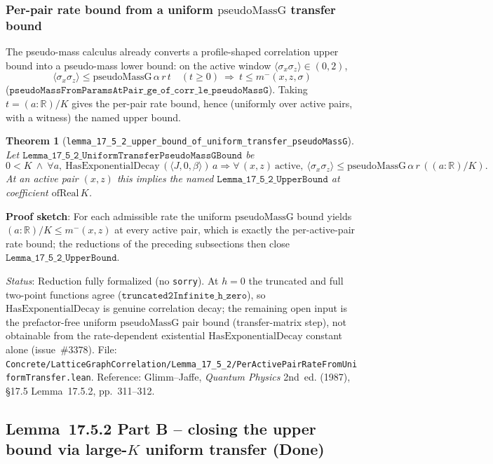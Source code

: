 \documentclass[a4paper,11pt]{article}
\newtheorem{theorem}{Theorem}
\begin{document}
\subsubsection*{Per-pair rate bound from a uniform $\mathrm{pseudoMassG}$ transfer
bound}

The pseudo-mass calculus already converts a profile-shaped correlation upper
bound into a pseudo-mass lower bound: on the active window
$\langle\sigma_x\sigma_z\rangle\in(0,2)$,
\[
  \langle\sigma_x\sigma_z\rangle\le \mathrm{pseudoMassG}\,\alpha\,r\,t
  \quad(t\ge0)
  \ \Longrightarrow\
  t\le m^-(x,z,\sigma)
\]
($\mathtt{pseudoMassFromParamsAtPair\_ge\_of\_corr\_le\_pseudoMassG}$).  Taking
$t=(a:\mathbb{R})/K$ gives the per-pair rate bound, hence (uniformly over active
pairs, with a witness) the named upper bound.

\begin{theorem}[\texttt{lemma\_17\_5\_2\_upper\_bound\_of\_uniform\_transfer\_pseudoMassG}]
Let $\mathtt{Lemma\_17\_5\_2\_UniformTransferPseudoMassGBound}$ be
\[
  0<K\ \wedge\ \forall a,\
  \mathrm{HasExponentialDecay}\,(\langle J,0,\beta\rangle)\,a
  \Rightarrow
  \forall\,(x,z)\ \text{active},\
  \langle\sigma_x\sigma_z\rangle\le\mathrm{pseudoMassG}\,\alpha\,r\,((a:\mathbb{R})/K).
\]
At an active pair $(x,z)$ this implies the named
$\mathtt{Lemma\_17\_5\_2\_UpperBound}$ at coefficient $\mathrm{ofReal}\,K$.
\end{theorem}

\noindent\textbf{Proof sketch}:
For each admissible rate the uniform $\mathrm{pseudoMassG}$ bound yields
$(a:\mathbb{R})/K\le m^-(x,z)$ at every active pair, which is exactly the
per-active-pair rate bound; the reductions of the preceding subsections then
close $\mathtt{Lemma\_17\_5\_2\_UpperBound}$.

\noindent\textit{Status}: Reduction fully formalized (no \texttt{sorry}).  At
$h=0$ the truncated and full two-point functions agree
($\mathtt{truncated2Infinite\_h\_zero}$), so $\mathrm{HasExponentialDecay}$ is
genuine correlation decay; the remaining open input is the prefactor-free uniform
$\mathrm{pseudoMassG}$ pair bound (transfer-matrix step), not obtainable from the
rate-dependent existential $\mathrm{HasExponentialDecay}$ constant alone
(issue~\#3378).
File:
\texttt{Concrete/LatticeGraphCorrelation/Lemma\_17\_5\_2/PerActivePairRateFromUniformTransfer.lean}.
Reference: Glimm--Jaffe, \emph{Quantum Physics} 2nd~ed. (1987),
\S17.5 Lemma~17.5.2, pp.~311--312.

\subsection*{Lemma~17.5.2 Part B -- closing the upper bound via large-$K$ uniform
transfer (Done)}
\end{document}
